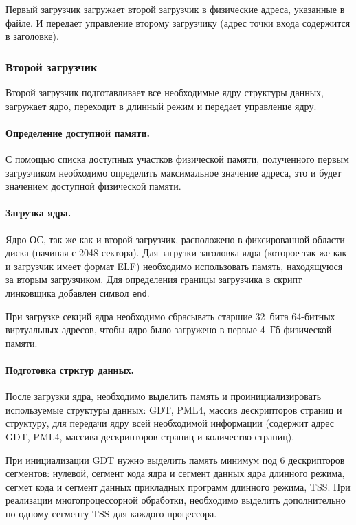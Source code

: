 Первый загрузчик загружает второй загрузчик в физические адреса, указанные в файле. И передает
управление второму загрузчику (адрес точки входа содержится в заголовке).


\subsubsection*{Второй загрузчик}
Второй загрузчик подготавливает все необходимые ядру структуры данных, загружает ядро,
переходит в длинный режим и передает управление ядру.

\paragraph{Определение доступной памяти.} С помощью списка доступных участков физической
памяти, полученного первым загрузчиком необходимо определить максимальное значение адреса,
это и будет значением доступной физической памяти.

\paragraph{Загрузка ядра.} Ядро ОС, так же как и второй загрузчик, расположено в фиксированной
области диска (начиная с 2048 сектора). Для загрузки заголовка ядра (которое так же как и
загрузчик имеет формат ELF) необходимо использовать память, находящуюся за вторым загрузчиком.
Для определения границы загрузчика в скрипт линковщика добавлен символ \texttt{end}.

При загрузке секций ядра необходимо сбрасывать старшие 32~бита 64-битных виртуальных адресов,
чтобы ядро было загружено в первые 4~Гб физической памяти.

\paragraph{Подготовка стрктур данных.} После загрузки ядра, необходимо выделить память и проинициализировать
используемые структуры данных: GDT, PML4, массив дескрипторов страниц и структуру, для передачи
ядру всей необходимой информации (содержит адрес GDT, PML4, массива дескрипторов страниц и количество страниц).

При инициализации GDT нужно выделить память минимум под 6 дескрипторов сегментов:
нулевой, сегмент кода ядра и сегмент данных ядра длинного режима, сегмет кода
и сегмент данных прикладных программ длинного режима, TSS. При реализации многопроцессорной
обработки, необходимо выделить дополнительно по одному сегменту TSS для каждого процессора.

